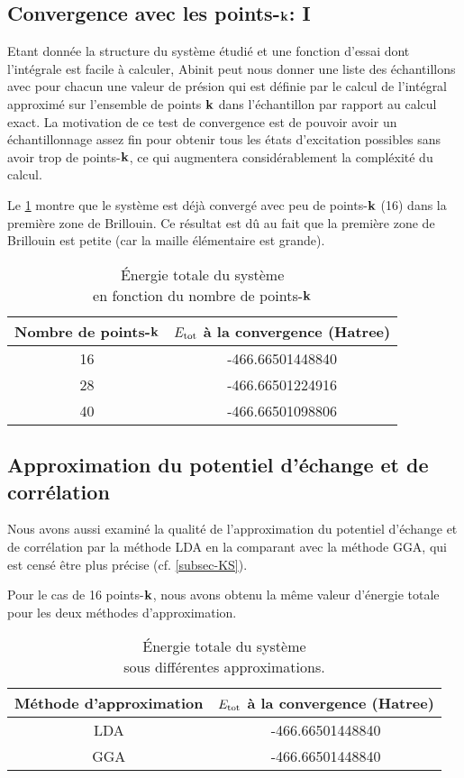 \subsection{Convergence avec les points-$\vb{k}$: I}
Etant donnée la structure du système étudié et une fonction d'essai dont l'intégrale est facile à calculer,
Abinit peut nous donner une liste des échantillons avec pour chacun une valeur de présion
qui est définie par le calcul de l'intégral approximé sur l'ensemble de points $\vb{k}$ dans l'échantillon
par rapport au calcul exact.
La motivation de ce test de convergence est de pouvoir avoir un échantillonnage
assez fin pour obtenir tous les états d'excitation possibles sans avoir trop de points-$\vb{k}$,
ce qui augmentera considérablement la compléxité du calcul.

Le \cref{tab-etotPK} montre que le système est déjà convergé avec peu de points-$\vb{k}$ (16) dans la première zone de Brillouin.
Ce résultat est dû au fait que la première zone de Brillouin est petite (car la maille élémentaire est grande).
\begin{table}[ht]
  \captionsetup{width=0.6\textwidth}
  \caption{Énergie totale du système\\ en fonction du nombre de points-$\vb{k}$}\label{tab-etotPK}
  \centering
  \begin{tabular}{c c}
    \toprule
    Nombre de points-$\vb{k}$  &  $E_{\textnormal{tot}}$ à la convergence (Hatree)
    \\
    \midrule
    16    &  -466.66501448840
    \\
    28    &  -466.66501224916
    \\
    40    &  -466.66501098806
    \\
    \bottomrule
  \end{tabular}
\end{table}

\subsection{Approximation du potentiel d'échange et de corrélation}
Nous avons aussi examiné la qualité de l'approximation du potentiel d'échange et de corrélation
par la méthode LDA en la comparant avec la méthode GGA,
qui est censé être plus précise (cf. \cref{subsec-KS}).

Pour le cas de 16 points-$\vb{k}$, nous avons obtenu la même valeur d'énergie totale pour les deux méthodes d'approximation.

\begin{table}[ht]
  \captionsetup{width=0.6\textwidth}
  \caption{Énergie totale du système\\ sous différentes approximations.}\label{tab-LDAGGA}
  \centering
  \begin{tabular}{c c}
    \toprule
    Méthode d'approximation &  $E_{\textnormal{tot}}$ à la convergence (Hatree)
    \\
    \midrule
    LDA    &  -466.66501448840
    \\
    GGA   &   -466.66501448840
    \\
    \bottomrule
  \end{tabular}
\end{table}

